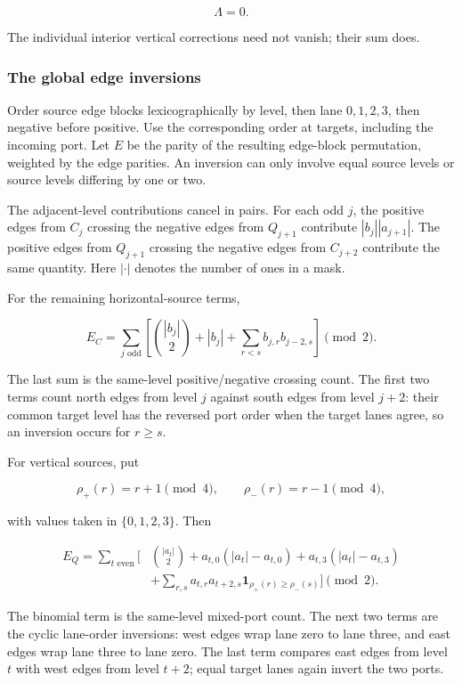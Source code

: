 \documentclass[11pt,letterpaper]{article}
\theoremstyle{plain}
\theoremstyle{definition}
\begin{document}
\begin{NoHyper}
\[
\Lambda=0.
\tag{4}
\]

The individual interior vertical corrections need not vanish; their sum does.

\subsubsection{The global edge inversions}

Order source edge blocks lexicographically by level, then lane \(0,1,2,3\), then negative before positive. Use the corresponding order at targets, including the incoming port. Let \(E\) be the parity of the resulting edge-block permutation, weighted by the edge parities. An inversion can only involve equal source levels or source levels differing by one or two.

The adjacent-level contributions cancel in pairs. For each odd \(j\), the positive edges from \(C_j\) crossing the negative edges from \(Q_{j+1}\) contribute \(|b_j||a_{j+1}|\). The positive edges from \(Q_{j+1}\) crossing the negative edges from \(C_{j+2}\) contribute the same quantity. Here \(|\cdot|\) denotes the number of ones in a mask.

For the remaining horizontal-source terms,

\[
E_C=\sum_{j\text{ odd}}\left[
\binom{|b_j|}{2}+|b_j|
+\sum_{r<s}b_{j,r}b_{j-2,s}
\right]\pmod2.
\tag{5}
\]

The last sum is the same-level positive/negative crossing count. The first two terms count north edges from level \(j\) against south edges from level \(j+2\): their common target level has the reversed port order when the target lanes agree, so an inversion occurs for \(r\ge s\).

For vertical sources, put

\[
\rho_+(r)=r+1\pmod4,\qquad \rho_-(r)=r-1\pmod4,
\]

with values taken in \(\{0,1,2,3\}\). Then

\[
\begin{aligned}
E_Q=\sum_{t\text{ even}}\bigg[&
\binom{|a_t|}{2}
+a_{t,0}(|a_t|-a_{t,0})
+a_{t,3}(|a_t|-a_{t,3})\\
&+\sum_{r,s}a_{t,r}a_{t+2,s}
\mathbf1_{\rho_+(r)\ge\rho_-(s)}\bigg]\pmod2.
\end{aligned}
\tag{6}
\]

The binomial term is the same-level mixed-port count. The next two terms are the cyclic lane-order inversions: west edges wrap lane zero to lane three, and east edges wrap lane three to lane zero. The last term compares east edges from level \(t\) with west edges from level \(t+2\); equal target lanes again invert the two ports.


\end{NoHyper}
\end{document}
